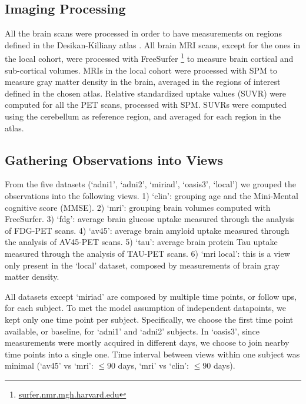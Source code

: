 \subsection{Imaging Processing}
All the brain scans were processed in order to have measurements on regions defined in the Desikan-Killiany atlas \citep{Desikan2006}.
All brain MRI scans, except for the ones in the local cohort, were processed with FreeSurfer \footnote{\href{https://surfer.nmr.mgh.harvard.edu/}{surfer.nmr.mgh.harvard.edu}} \citep{freesurfer} to measure brain cortical and sub-cortical volumes.
MRIs in the local cohort were processed with SPM \citep{Ashburner2000} to measure gray matter density in the brain, averaged in the regions of interest defined in the chosen atlas.
Relative standardized uptake values (SUVR) were computed for all the PET scans, processed with SPM.
SUVRs were computed using the cerebellum as reference region, and averaged for each region in the atlas.

\subsection{Gathering Observations into Views}
From the five datasets (`adni1', `adni2', `miriad', `oasis3', `local') we grouped the observations into the following views.
1) `clin': grouping age and the Mini-Mental cognitive score (MMSE).
2) `mri': grouping brain volumes computed with FreeSurfer.
3) `fdg': average brain glucose uptake measured through the analysis of FDG-PET scans.
4) `av45': average brain amyloid uptake measured through the analysis of AV45-PET scans.
5) `tau': average brain protein Tau uptake measured through the analysis of TAU-PET scans.
6) `mri local': this is a view only present in the `local' dataset, composed by measurements of brain gray matter density.

All datasets except `miriad' are composed by multiple time points, or follow ups, for each subject.
To met the model assumption of independent datapoints, we kept only one time point per subject.
Specifically, we choose the first time point available, or baseline, for `adni1' and `adni2' subjects.
In `oasis3', since measurements were mostly acquired in different days, we choose to join nearby time points into a single one.
Time interval between views within one subject was minimal (`av45' vs `mri': $\leq 90$ days, `mri' vs `clin': $\leq 90$ days).

